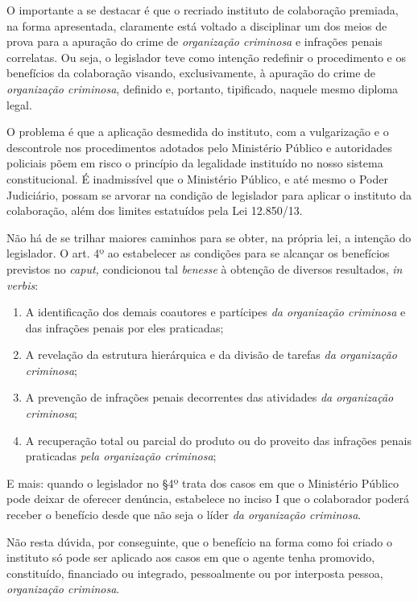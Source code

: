 O importante a se destacar é que o recriado instituto de colaboração
premiada, na forma apresentada, claramente está voltado a disciplinar um
dos meios de prova para a apuração do crime de \emph{organização
criminosa} e infrações penais correlatas. Ou seja, o legislador teve
como intenção redefinir o procedimento e os benefícios da colaboração
visando, exclusivamente, à apuração do crime de \emph{organização
criminosa}, definido e, portanto, tipificado, naquele mesmo diploma
legal.

O problema é que a aplicação desmedida do instituto, com a vulgarização
e o descontrole nos procedimentos adotados pelo Ministério Público e
autoridades policiais põem em risco o princípio da legalidade instituído
no nosso sistema constitucional. É inadmissível que o Ministério
Público, e até mesmo o Poder Judiciário, possam se arvorar na condição
de legislador para aplicar o instituto da colaboração, além dos limites
estatuídos pela Lei 12.850/13.

Não há de se trilhar maiores caminhos para se obter, na própria lei, a
intenção do legislador. O art. 4º ao estabelecer as condições para se
alcançar os benefícios previstos no \emph{caput,} condicionou tal
\emph{benesse} à obtenção de diversos resultados, \emph{in verbis}:

\begin{enumerate}[label=\Roman*]
\item A identificação dos demais coautores e partícipes \emph{da
organização criminosa} e das infrações penais por eles praticadas;

\item A revelação da estrutura hierárquica e da divisão de tarefas
\emph{da organização criminosa};

\item A prevenção de infrações penais decorrentes das atividades
\emph{da organização criminosa};

\item A recuperação total ou parcial do produto ou do proveito das
infrações penais praticadas \emph{pela organização criminosa};
\end{enumerate}

E mais: quando o legislador no §4º trata dos casos em que o
Ministério Público pode deixar de oferecer denúncia, estabelece no
inciso I que o colaborador poderá receber o benefício desde que não seja
o líder \emph{da organização criminosa}.

Não resta dúvida, por conseguinte, que o benefício na forma como foi
criado o instituto só pode ser aplicado aos casos em que o agente tenha
promovido, constituído, financiado ou integrado, pessoalmente ou por
interposta pessoa, \emph{organização criminosa}.

